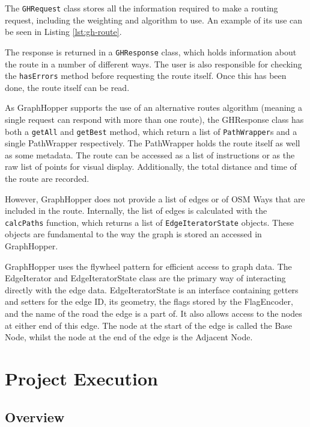 \documentclass[ %
                    author={Alexander Hill},
                supervisor={Dr. Benjamin Sach},
                    degree={MEng},
                     title={MARMOSET},
                  subtitle={Multi-Agent Route Management using Online Simulation for Efficient Transportation},
                      type={research},
                      year={2016} ]{dissertation}
\begin{document}
The \texttt{GHRequest} class stores all the information required to make a
routing request, including the weighting and algorithm to use. An example of its
use can be seen in Listing \ref{lst:gh-route}.

The response is returned in a \texttt{GHResponse} class, which holds information
about the route in a number of different ways. The user is also responsible for
checking the \texttt{hasErrors} method before requesting the route itself.  Once
this has been done, the route itself can be read.

As GraphHopper supports the use of an alternative routes algorithm (meaning a
single request can respond with more than one route), the GHResponse class has
both a \texttt{getAll} and \texttt{getBest} method, which return a list of
\texttt{PathWrapper}s and a single PathWrapper respectively. The PathWrapper
holds the route itself as well as some metadata. The route can be accessed as a
list of instructions or as the raw list of points for visual display.
Additionally, the total distance and time of the route are recorded.

However, GraphHopper does not provide a list of edges or of OSM Ways that are
included in the route. Internally, the list of edges is calculated with the
\texttt{calcPaths} function, which returns a list of \texttt{EdgeIteratorState}
objects. These objects are fundamental to the way the graph is stored an
accessed in GraphHopper.

GraphHopper uses the flywheel pattern for efficient access to graph data. The
EdgeIterator and EdgeIteratorState class are the primary way of interacting
directly with the edge data. EdgeIteratorState is an interface containing
getters and setters for the edge ID, its geometry, the flags stored by the
FlagEncoder, and the name of the road the edge is a part of. It also allows
access to the nodes at either end of this edge. The node at the start of the
edge is called the Base Node, whilst the node at the end of the edge is the
Adjacent Node.


\chapter{Project Execution}
\label{chap:execution}

\section{Overview}
\end{document}
